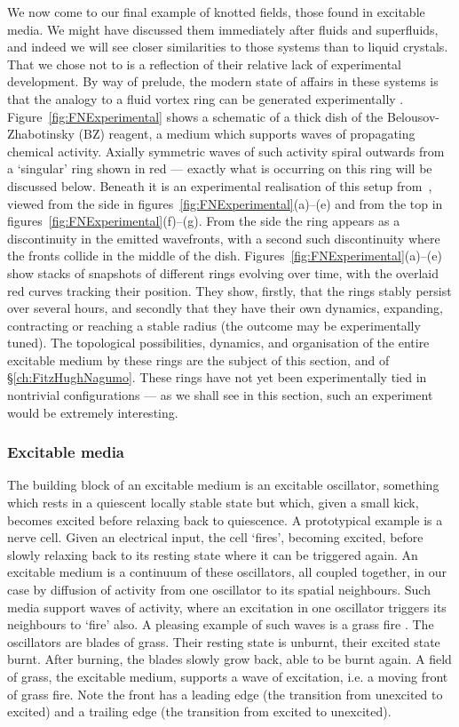 We now come to our final example of knotted fields, those found in excitable media. We might have discussed them immediately after fluids and superfluids, and indeed we will see closer similarities to those systems than to liquid crystals. That we chose not to is a reflection of their relative lack of experimental development. By way of prelude, the modern state of affairs in these systems is that the analogy to a fluid vortex ring can be generated experimentally \citep{Steinbock2006,Azhand2014, Totz2015}. Figure~\ref{fig:FNExperimental} shows a schematic of a thick dish of the Belousov-Zhabotinsky (BZ) reagent, a medium which supports waves of propagating chemical activity. Axially symmetric waves of such activity spiral outwards from a `singular' ring shown in red --- exactly what is occurring on this ring will be discussed below. Beneath it is an experimental realisation of this setup from~\citep{Totz2015}, viewed from the side in figures~\ref{fig:FNExperimental}(a)--(e) and from the top in figures~\ref{fig:FNExperimental}(f)--(g). From the side the ring appears as a discontinuity in the emitted wavefronts, with a second such discontinuity where the fronts collide in the middle of the dish. Figures~\ref{fig:FNExperimental}(a)--(e) show stacks of snapshots of different rings evolving over time, with the overlaid red curves tracking their position. They show, firstly, that the rings stably persist over several hours, and secondly that they have their own dynamics, expanding, contracting or reaching a stable radius (the outcome may be experimentally tuned). The topological possibilities, dynamics, and organisation of the entire excitable medium by these rings are the subject of this section, and of \S \ref{ch:FitzHughNagumo}. These rings have not yet been experimentally tied in nontrivial configurations --- as we shall see in this section, such an experiment would be extremely interesting.

\subsubsection{Excitable media}

The building block of an excitable medium is an excitable oscillator, something which rests in a quiescent locally stable state but which, given a small kick, becomes excited before relaxing back to quiescence. A prototypical example is a nerve cell. Given an electrical input, the cell `fires', becoming excited, before slowly relaxing back to its resting state where it can be triggered again. An excitable medium is a continuum of these oscillators, all coupled together, in our case by diffusion of activity from one oscillator to its spatial neighbours. Such media support waves of activity, where an excitation in one oscillator triggers its neighbours to `fire' also. A pleasing example of such waves is a grass fire \citep{Winfree1983}. The oscillators are blades of grass. Their resting state is unburnt, their excited state burnt. After burning, the blades slowly grow back, able to be burnt again. A field of grass, the excitable medium, supports a wave of excitation, i.e. a moving front of grass fire. Note the front has a leading edge (the transition from unexcited to excited) and a trailing edge (the transition from excited to unexcited).

